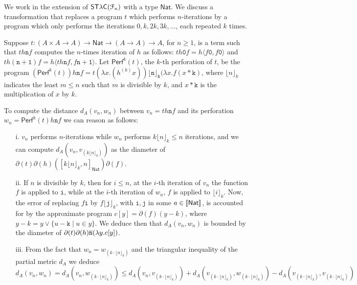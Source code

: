 \begin{example}
We work in the extension of $\mathsf{ST\lambda C}(\mathcal F_{n})$ with a type $\mathsf{Nat}$.
We discuss a transformation that replaces a program $t$ which performs $n$-iterations by a program which only performs the iterations $0,k,2k,3k,\dots$, each repeated $k$ times. 

Suppose  $t: (A\times A\to A) \to \mathsf{Nat}\to (A\to A)\to A$, for $n\geq 1$, is a term such that $th\mathtt n f$ 
computes the $n$-times iteration of $h$ as follows: $th \mathtt 0f= h\langle f\mathtt 0, f\mathtt 0\rangle$ and $th(\mathtt{n+1})f=h\langle th\mathtt n f, f\mathtt{n+1}\rangle$. 
Let $\mathsf{Perf}^{k}(t)$, the $k$-th perforation of $t$, be the program   
$(\mathsf{Perf}^{k}(t))h\mathtt nf= t(\lambda x. (h^{(k)}x)) \mathtt{\lfloor n\rfloor_{k}} (\lambda x. f(x* \mathtt k)$, where $\lfloor n\rfloor_{k}$ indicates the least $m\leq n$ such that $m$ is divisible by $k$, and $x*\mathtt k$ is the multiplication of $x$ by $k$. 





To compute the distance 
$d_{A}(v_{n},w_{n}    )$ between  $v_{n}=th\mathtt n f $ and its perforation $w_{n}=\mathsf{Perf}^{k}(t)h\mathtt nf$  we can reason as follows: 
\begin{itemize}

\item[i.] $v_{n}$ performs $n$-iterations while $w_{n}$ performs $k\lfloor n\rfloor_{k}  \leq n$ iterations, and we can compute  
$d_{A}(v_{n}, v_{(k \lfloor n\rfloor_{k})})$ as the diameter of 
$\partial(t)\partial(h)([ k \lfloor n\rfloor_{k}, n]_{\mathsf{Nat}}) \partial(f)$.




\item[ii.] If $n$ is divisible by $k$, then for $i\leq n$, at the $i$-th iteration of $v_{n}$ the function $f$ is applied  to $\mathtt i$, while at the $i$-th iteration of $w_{n}$, $f$ is applied to $\lfloor i\rfloor_{k}$. Now, the error of replacing  $f\mathtt i$ by $ f\lfloor \mathtt j\rfloor_{k}$, with $\mathtt i,\mathtt j$ in some $a\in \llbracket \mathsf{Nat} \rrbracket$, is accounted for by the approximate program $c[y]= \partial(f)(y-k  )$, where $y-k= y \vee \{u-\mathtt k\mid u \in y\}$.
We deduce then that 
$d_{A}(v_{n}, w_{n})$ is bounded by the diameter of $\partial(t)\partial(h)\overline{\mathtt n} (\lambda y.c[y])$.

\item[iii.] From the fact that $w_{n}=w_{(k\cdot \lfloor n\rfloor_{k})}$ and the triangular inequality of the partial metric $d_{A}$ we deduce  
$d_{A}(v_{n}, w_{n})=
d_{A}(v_{n},w_{(k\cdot \lfloor n\rfloor_{k})}) \leq
d_{A}(v_{n}, v_{(k\cdot \lfloor n\rfloor_{k})})+
d_{A}(v_{(k\cdot \lfloor n\rfloor_{k})}, w_{(k\cdot \lfloor n\rfloor_{k})})-
d_{A}(v_{(k\cdot \lfloor n\rfloor_{k})},v_{(k\cdot \lfloor n\rfloor_{k})} )$



\end{itemize}
\end{example}
